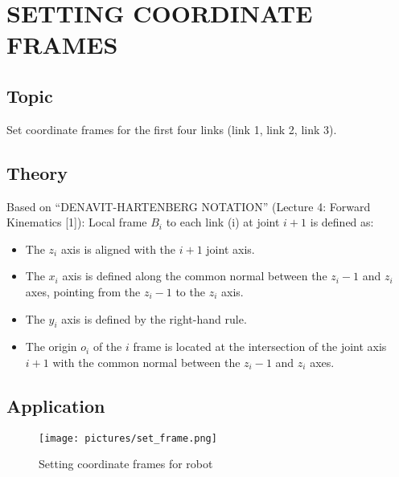 \chapter{SETTING COORDINATE FRAMES}
    \section{Topic}
        \hspace*{0.6cm}Set coordinate frames for the first four links (link 1, link 2, link 3).
    \section{Theory}
    \hspace*{0.6cm}Based on “DENAVIT-HARTENBERG NOTATION” (Lecture 4: Forward Kinematics [1]): Local frame \textbf{$B_i$} to each link (i) at joint $i+1$ is defined as:
    \begin{itemize}
        \item The $z_i$ axis is aligned with the $i + 1$ joint axis.
        \item The $x_i$ axis is defined along the common normal between the $z_i - 1$ and $z_i$
        axes, pointing from the $z_i - 1$ to the $z_i$ axis.
        \item The $y_i$ axis is defined by the right-hand rule.
        \item The origin $o_i$ of the $i$ frame is located at the intersection of the joint axis $i+1$ with the common normal between the $z_i - 1$ and $z_i$ axes.
    \end{itemize}

    \section{Application}
    \begin{figure}[H]
        \centering
        \texttt{[image: pictures/set\_frame.png]} 
        \caption{Setting coordinate frames for robot}
    \end{figure}
